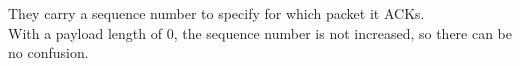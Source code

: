 They carry a sequence number to specify for which packet it ACKs.\\
With a payload length of 0, the sequence number is not increased, so there can be no confusion.